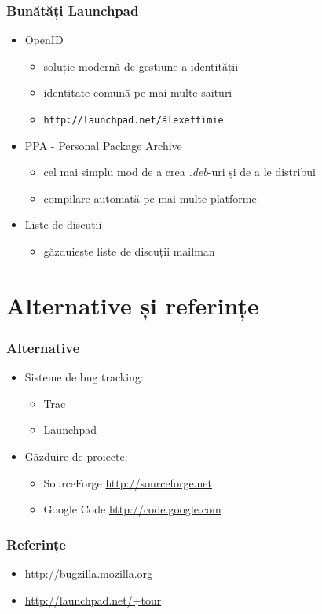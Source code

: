 \documentclass{beamer}
\begin{document}
\begin{frame}
\frametitle{Bunătăți Launchpad}
\begin{itemize}
\item OpenID
\begin{itemize}
\item soluție modernă de gestiune a identității
\item identitate comună pe mai multe saituri
\item \texttt{http://launchpad.net/\~alexeftimie}
\end{itemize}
\item PPA - Personal Package Archive
\begin{itemize}
\item cel mai simplu mod de a crea \emph{.deb}-uri și de a le distribui
\item compilare automată pe mai multe platforme
\end{itemize}
\item Liste de discuții
\begin{itemize}
\item găzduiește liste de discuții mailman
\end{itemize}
\end{itemize}
\end{frame}

\section {Alternative și referințe}
\frame{\tableofcontents[currentsection]}

\begin{frame}
\frametitle{Alternative}
\begin{itemize}
\item Sisteme de bug tracking:
\begin{itemize}
\item Trac
\item Launchpad
\end{itemize}
\item Găzduire de proiecte:
\begin{itemize}
\item SourceForge \url{http://sourceforge.net}
\item Google Code \url{http://code.google.com}
\end{itemize}
\end{itemize}
\end{frame}

\begin{frame}
\frametitle{Referințe}
\begin{itemize}
\item \url{http://bugzilla.mozilla.org}
\item \url{http://launchpad.net/+tour}
\end{itemize}
\end{frame}
\end{document}
